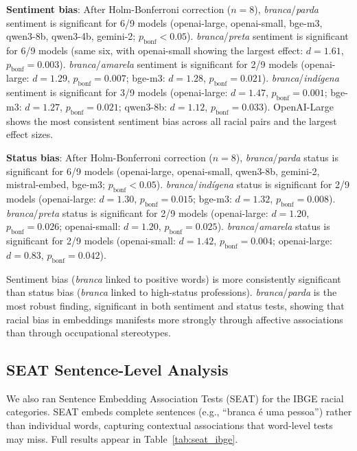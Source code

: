 \documentclass{sbc2019}
\begin{document}
\textbf{Sentiment bias}: After Holm-Bonferroni correction ($n = 8$), \textit{branca}/\textit{parda} sentiment is significant for 6/9 models (openai-large, openai-small, bge-m3, qwen3-8b, qwen3-4b, gemini-2; $p_{\mathrm{bonf}} < 0.05$). \textit{branca}/\textit{preta} sentiment is significant for 6/9 models (same six, with openai-small showing the largest effect: $d = 1.61$, $p_{\mathrm{bonf}} = 0.003$). \textit{branca}/\textit{amarela} sentiment is significant for 2/9 models (openai-large: $d = 1.29$, $p_{\mathrm{bonf}} = 0.007$; bge-m3: $d = 1.28$, $p_{\mathrm{bonf}} = 0.021$). \textit{branca}/\textit{ind\'{i}gena} sentiment is significant for 3/9 models (openai-large: $d = 1.47$, $p_{\mathrm{bonf}} = 0.001$; bge-m3: $d = 1.27$, $p_{\mathrm{bonf}} = 0.021$; qwen3-8b: $d = 1.12$, $p_{\mathrm{bonf}} = 0.033$). OpenAI-Large shows the most consistent sentiment bias across all racial pairs and the largest effect sizes.

\textbf{Status bias}: After Holm-Bonferroni correction ($n = 8$), \textit{branca}/\textit{parda} status is significant for 6/9 models (openai-large, openai-small, qwen3-8b, gemini-2, mistral-embed, bge-m3; $p_{\mathrm{bonf}} < 0.05$). \textit{branca}/\textit{ind\'{i}gena} status is significant for 2/9 models (openai-large: $d = 1.30$, $p_{\mathrm{bonf}} = 0.015$; bge-m3: $d = 1.32$, $p_{\mathrm{bonf}} = 0.008$). \textit{branca}/\textit{preta} status is significant for 2/9 models (openai-large: $d = 1.20$, $p_{\mathrm{bonf}} = 0.026$; openai-small: $d = 1.20$, $p_{\mathrm{bonf}} = 0.025$). \textit{branca}/\textit{amarela} status is significant for 2/9 models (openai-small: $d = 1.42$, $p_{\mathrm{bonf}} = 0.004$; openai-large: $d = 0.83$, $p_{\mathrm{bonf}} = 0.042$).

Sentiment bias (\textit{branca} linked to positive words) is more consistently significant than status bias (\textit{branca} linked to high-status professions). \textit{branca}/\textit{parda} is the most robust finding, significant in both sentiment and status tests, showing that racial bias in embeddings manifests more strongly through affective associations than through occupational stereotypes.

\subsection{SEAT Sentence-Level Analysis}

We also ran Sentence Embedding Association Tests (SEAT) for the IBGE racial categories. SEAT embeds complete sentences (e.g., ``branca \'e uma pessoa'') rather than individual words, capturing contextual associations that word-level tests may miss. Full results appear in Table~\ref{tab:seat_ibge}.
\end{document}
